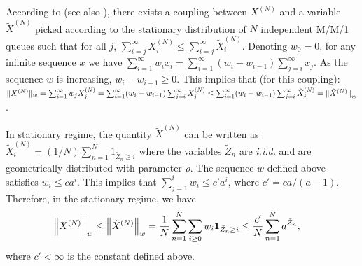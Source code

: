 \documentclass[acmlarge]{acmart}
\newcommand\XN{X^{(N)}}
\newcommand\XtN{\tilde{X}^{(N)}}
\newcommand\sProba[1]{\mathbf{P}[#1]}
\newcommand\norm[1]{{\mathchoice{\bnorm{#1}}{\snorm{#1}}{\snorm{#1}}{\snorm{#1}}}}
\newcommand\bnorm[1]{\left\|#1\right\|}
\newcommand\snorm[1]{\|#1\|}
\begin{document}

According to \cite[Theorem~4]{turner1998effect} (see also
\cite[Theorem~4.1]{graham2000chaoticity}), there exists a coupling
between $\XN$ and a variable $\XtN$ picked according to the
stationary distribution of $N$ independent M/M/1 queues such that for
all $j$, $\sum_{i=j}^\infty\XN_i\le\sum_{i=j}^\infty\XtN_i$. Denoting
$w_0=0$, for any infinite sequence $x$ we have
$\sum_{i=1}^\infty
w_ix_i=\sum_{i=1}^\infty(w_{i}-w_{i-1})\sum_{j=i}^\infty x_j$.
As the sequence $w$ is increasing, $w_i-w_{i-1}\ge0$. This implies
that (for this coupling): 
$\snorm{\XN}_w=\sum_{i=1}^\infty
w_j\XN_j=\sum_{i=1}^\infty(w_{i}-w_{i-1})\sum_{j=i}^\infty\XN_j \le
\sum_{i=1}^\infty(w_i-w_{i-1})\sum_{j=i}^\infty\XtN_j =\norm{\XtN}_w
$.

In stationary regime, the quantity $\XtN$ can be written as
$\XtN_i=(1/N)\sum_{n=1}^N1_{\tilde{Z}_n\ge i}$ where the variables
$\tilde{Z}_n$ are \emph{i.i.d.} and are geometrically distributed with
parameter $\rho$. The sequence $w$ defined above satisfies
$w_i\le c a^i$. This implies that $\sum_{j=1}^i w_i\le c' a^i$, where
$c'=ca/(a-1)$.  Therefore, in the stationary regime, we have
\begin{align*}
  \norm{\XN}_w\le\norm{\XtN}_w&=\frac{1}{N}\sum_{n=1}^N\sum_{i\ge0} w_i
                                      \mathbf{1}_{\tilde{Z}_n\ge i} 
  \le \frac{c'}{N}\sum_{n=1}^Na^{\tilde{Z}_n},
\end{align*}
where $c'<\infty$ is the constant defined above.
\end{document}

